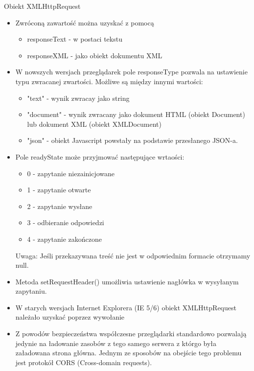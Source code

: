 \documentclass[../main.tex]{subfiles}
\begin{document}
    Obiekt XMLHttpRequest
    \begin{itemize}
        \item Zwróconą zawartość można uzyskać z pomocą
        \begin{itemize}
            \item responseText - w postaci tekstu
            \item responseXML - jako obiekt dokumentu XML
        \end{itemize}
        \item W nowszych wersjach przeglądarek pole responseType pozwala na
        ustawienie typu zwracanej zwartości. Możliwe są między innymi wartości:
        \begin{itemize}
            \item "text" - wynik zwracay jako string
            \item "document" - wynik zwracany jako dokument HTML (obiekt Document) lub dokument XML (obiekt XMLDocument)
            \item "json" - obiekt Javascript powstały na podstawie przesłanego JSON-a.
        \end{itemize}
        \item Pole readyState może przyjmować następujące wrtaości:
        \begin{itemize}
            \item 0 - zapytanie niezainicjowane
            \item 1 - zapytanie otwarte
            \item 2 - zapytanie wysłane
            \item 3 - odbieranie odpowiedzi
            \item 4 - zapytanie zakończone
        \end{itemize}
        Uwaga: Jeśli przekazywana treść nie jest w odpowiednim formacie otrzymamy
        null.
        \item Metoda setRequestHeader() umożliwia ustawienie nagłówka w wysyłanym
        zapytaniu.
        \item W starych wersjach Internet Explorera (IE 5/6) obiekt XMLHttpRequest należało
        uzyskać poprzez wywołanie
        \item Z powodów bezpieczeństwa współczesne przeglądarki standardowo
        pozwalają jedynie na ładowanie zasobów z tego samego serwera z którgo była
        załadowana strona główna. Jednym ze sposobów na obejście tego problemu
        jest protokół CORS (Cross-domain requests).
    \end{itemize}
\end{document}
